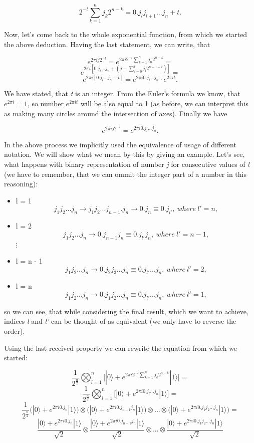 \[ 2^{-l}\sum_{k = 1}^{n} j_k 2^{n - k} = 0.j_l j_{l+1} ... j_n + t.\]

Now, let's come back to the whole exponential function, from which we started the above deduction. Having the last statement, we can write, that

\[ e^{2 \pi ij 2^{-l}} = e^{2 \pi i 2^{-l} \sum_{k=1}^{n} j_n 2^{n - k}} = \]
\[ e^{2 \pi i [0.j_l...j_n + (j - \sum_{i = 0}^{l}j_i 2^{n - 1 - i})]} = \]
\[ e^{2 \pi i [0.j_l...j_n + t]} = e^{2 \pi i 0.j_l...j_n} \cdot e^{2 \pi i t}. \]

We have stated, that \textit{t} is an integer. From the Euler's formula we know, that $e^{2 \pi i} = 1$, so number $e^{2 \pi i t}$ will be also equal to 1 (as before, we can interpret this as making many circles around the intersection of axes). Finally we have

\[ e^{2 \pi i j 2^{-l}} = e ^{2 \pi i 0.j_l ... j_n}.\]

\begin{remark}
In the above process we implicitly used the equivalence of usage of different notation. We will show what we mean by this by giving an example. Let's see, what happens with binary representation of number \textit{j} for consecutive values of \textit{l} (we have to remember, that we can ommit the integer part of a number in this reasoning):
\begin{itemize}
    \item l = 1
    \[ j_1 j_2 ... j_n \rightarrow j_1 j_2 ... j_{n-1}.j_n \rightarrow 0.j_n \equiv 0.j_{l'},\  where\ l' = n,\]
    \item l = 2
    \[ j_1 j_2 ... j_n \rightarrow 0.j_{n-1}j_n \equiv 0.j_{l'}j_n,\  where\ l' = n - 1,\]
    $\vdots$ 
    \item l = n - 1
    \[ j_1 j_2 ... j_n \rightarrow 0.j_2 j_3 ... j_n \equiv 0.j_{l'}...j_n,\  where\ l' = 2,\]
    \item l = n
    \[ j_1 j_2 ... j_n \rightarrow 0.j_1 j_2 ... j_n \equiv 0.j_{l'}... j_n,\  where\ l' = 1,\]
\end{itemize}

so we can see, that while considering the final result, which we want to achieve, indices \textit{l} and \textit{l'} can be thought of as equivalent (we only have to reverse the order).
\end{remark}

Using the last received property we can rewrite the equation from which we started:

\[ \frac{1}{2^{\frac{n}{2}}} \bigotimes_{l=1}^{n} \bigg[ |0\rangle + e^{2 \pi i 2^{-l} \sum_{k = 1}^{n}j_k 2^{n - k}}|1\rangle \bigg] = \]
\[ \frac{1}{2^{\frac{n}{2}}} \bigotimes_{l=1}^{n} \bigg[ |0\rangle + e^{2 \pi i 0.j_l ... j_n}|1\rangle \bigg] = \]
\[ \frac{1}{2^{\frac{n}{2}}} \bigg( |0\rangle + e^{2 \pi i 0.j_n}|1\rangle \bigg) \otimes \bigg( |0\rangle + e^{2 \pi i 0.j_{n - 1} j_n}|1\rangle \bigg) \otimes ... \otimes \bigg( |0\rangle + e^{2 \pi i 0.j_1 j_2 ... j_n}|1\rangle \bigg) = \]
\[ \frac{|0\rangle + e^{2 \pi i 0.j_n}|1\rangle}{\sqrt{2}} \otimes \frac{|0\rangle + e^{2 \pi i 0.j_{n - 1} j_n}|1\rangle}{\sqrt{2}} \otimes ... \otimes \frac{|0\rangle + e^{2 \pi i 0.j_1 j_2 ... j_n}|1\rangle}{\sqrt{2}}\]

